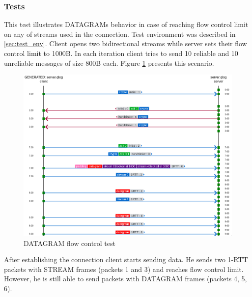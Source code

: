 \subsubsection{Tests}
This test illustrates DATAGRAMs behavior in case of reaching flow control limit on any of streams used in the connection.
Test environment was described in \ref{sec:test_env}.
Client opens two bidirectional streams while server sets their flow control limit to 1000B.
In each iteration client tries to send 10 reliable and 10 unreliable messages of size 800B each.
Figure \ref{fig:dgram_flow_control} presents this scenario.

\begin{figure}[h]
  \centering
  \includegraphics[width=\textwidth]{img/__09__datagrams/dgram_flow_control.png}
  \caption{DATAGRAM flow control test}
  \label{fig:dgram_flow_control}
\end{figure}

After establishing the connection client starts sending data.
He sends two 1-RTT packets with STREAM frames (packets 1 and 3) and reaches flow control limit.
However, he is still able to send packets with DATAGRAM frames (packets 4, 5, 6).


